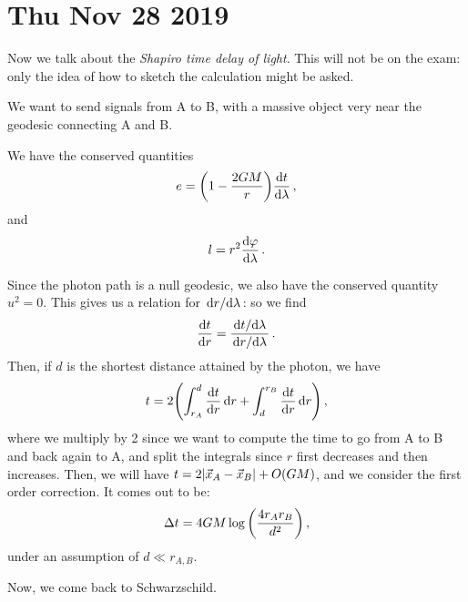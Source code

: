 \documentclass[main.tex]{subfiles}
\begin{document}
\section*{Thu Nov 28 2019}

Now we talk about the \emph{Shapiro time delay of light}.
This will not be on the exam: only the idea of how to sketch the calculation might be asked. 

We want to send signals from A to B, with a massive object very near the geodesic connecting A and B. 

We have the conserved quantities 
%
\begin{align}
  e = \qty(1 - \frac{2GM}{r}) \dv{t}{\lambda  }
\,,
\end{align}
%
and 
%
\begin{align}
  l = r^2 \dv{\varphi }{\lambda  }
\,.
\end{align}

Since the photon path is a null geodesic, we also have the conserved quantity \(u^2= 0\). 
This gives us a relation for \(\dv*{r}{\lambda  }\): so we find 
%
\begin{align}
  \dv{t}{r} = \frac{\dv*{t}{\lambda }}{\dv*{r}{\lambda }}
  \,.
\end{align}
%
Then, if \(d\) is the shortest distance attained by the photon, we have 
%
\begin{align}
  t = 2 \qty(\int_{r_{A}}^{d} \dv{t}{r} \dd{r} + \int_{d}^{r_B} \dv{t}{r} \dd{r})
\,,
\end{align}
%
where we multiply by 2 since we want to compute the time to go from A to B and back again to A, and split the integrals since \(r\) first decreases and then increases. 
Then, we will have \(t = 2\abs{\vec{x}_A - \vec{x}_B} + O(GM)\), and we consider the first order correction. It comes out to be: 
%
\begin{align}
  \Delta t = 4GM \log \qty(\frac{4 r_A r_B}{d^2})
\,,
\end{align}
%
under an assumption of \(d \ll r_{A, B}\). 

Now, we come back to Schwarzschild. 
\end{document}
